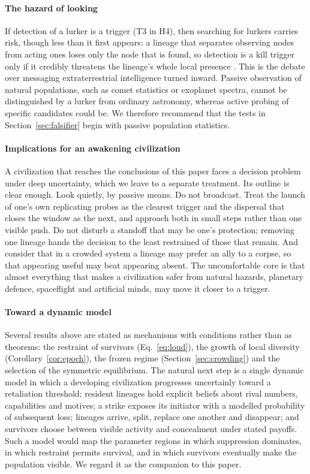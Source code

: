 \documentclass[preprint,12pt]{elsarticle}
\theoremstyle{definition}
\begin{document}
\paragraph{The hazard of looking}
If detection of a lurker is a trigger (T3 in H4), then searching for lurkers carries risk, though less than it first appears: a lineage that separates observing nodes from acting ones loses only the node that is found, so detection is a kill trigger only if it credibly threatens the lineage's whole local presence \citep{Lopin2026b}. This is the debate over messaging extraterrestrial intelligence turned inward. Passive observation of natural populations, such as comet statistics or exoplanet spectra, cannot be distinguished by a lurker from ordinary astronomy, whereas active probing of specific candidates could be. We therefore recommend that the tests in Section~\ref{sec:falsifier} begin with passive population statistics.

\paragraph{Implications for an awakening civilization}
A civilization that reaches the conclusions of this paper faces a decision problem under deep uncertainty, which we leave to a separate treatment. Its outline is clear enough. Look quietly, by passive means. Do not broadcast. Treat the launch of one's own replicating probes as the clearest trigger and the dispersal that closes the window as the next, and approach both in small steps rather than one visible push. Do not disturb a standoff that may be one's protection; removing one lineage hands the decision to the least restrained of those that remain. And consider that in a crowded system a lineage may prefer an ally to a corpse, so that appearing useful may beat appearing absent. The uncomfortable core is that almost everything that makes a civilization safer from natural hazards, planetary defence, spaceflight and artificial minds, may move it closer to a trigger.

\paragraph{Toward a dynamic model}
Several results above are stated as mechanisms with conditions rather than as theorems: the restraint of survivors (Eq.~\ref{eq:loud}), the growth of local diversity (Corollary~\ref{cor:epoch}), the frozen regime (Section~\ref{sec:crowding}) and the selection of the symmetric equilibrium. The natural next step is a single dynamic model in which a developing civilization progresses uncertainly toward a retaliation threshold; resident lineages hold explicit beliefs about rival numbers, capabilities and motives; a strike exposes its initiator with a modelled probability of subsequent loss; lineages arrive, split, replace one another and disappear; and survivors choose between visible activity and concealment under stated payoffs. Such a model would map the parameter regions in which suppression dominates, in which restraint permits survival, and in which survivors eventually make the population visible. We regard it as the companion to this paper.
\end{document}
